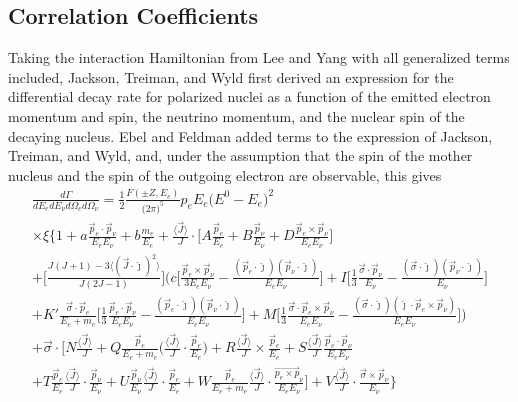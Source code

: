 \subsection{Correlation Coefficients} \label{ssec:correlations}
Taking the interaction Hamiltonian from Lee and Yang with all generalized terms included,
Jackson, Treiman, and Wyld \cite{jackson1957a,jackson1957b} first derived an expression
for the differential decay rate for polarized nuclei as a function of the emitted electron momentum
and spin, the neutrino momentum, and the nuclear spin of the decaying nucleus.
Ebel and Feldman \cite{ebel1957} added terms to the expression of Jackson, Treiman, and Wyld,
and, under the assumption that the spin of the mother nucleus and the spin of the outgoing electron
are observable, this gives
%
\begin{multline}
  \frac{d\Gamma}{dE_e dE_\nu d\Omega_e d\Omega_\nu} = \frac{1}{2} \frac{F(\pm Z, E_e)}{\big( 2\pi \big)^5}
  p_e E_e \big( E^0 - E_e \big)^2 \\ \times \xi 
  \Bigg\{ 1 + a\frac{\vec{p}_e \cdot \vec{p}_\nu}{E_e E_\nu} + b\frac{m_e}{E_e} 
  + \frac{\langle\vec{ J }\rangle}{J} \cdot \Bigg[ A\frac{\vec{p}_e}{E_e}
    + B\frac{\vec{p}_\nu}{E_\nu} + D\frac{\vec{p}_e \times \vec{p}_\nu}{E_e E_\nu}\Bigg] \\
  + \Bigg[ \frac{J(J+1)-3\langle (\vec{J} \cdot \hat{\jmath})^2 \rangle}{J(2J-1)} \Bigg]
  \Bigg( c\Bigg[ \frac{\vec{p}_e \times \vec{p}_\nu}{3E_eE_\nu} -
    \frac{(\vec{p}_e \cdot \hat{\jmath})(\vec{p}_\nu \cdot \hat{\jmath}) }{E_eE_\nu} \Bigg]
  + I \Bigg[ \frac{1}{3}\frac{\vec{\sigma} \cdot \vec{p}_\nu}{E_\nu}
    - \frac{(\vec{\sigma} \cdot \hat{\jmath})(\vec{p}_\nu \cdot \hat{\jmath})}{E_\nu} \Bigg] \\
  + K'\frac{\vec{\sigma} \cdot \vec{p}_e}{E_e+m_e} \Bigg[ \frac{1}{3}\frac{\vec{p}_e \cdot \vec{p}_\nu}{E_e E_\nu}
    - \frac{(\vec{p}_e \cdot \hat{\jmath})(\vec{p}_\nu \cdot \hat{\jmath})}{E_e E_\nu} \Bigg] 
  + M \Bigg[ \frac{1}{3}\frac{\vec{\sigma} \cdot \vec{p}_e \times \vec{p}_\nu}{E_e E_\nu}
    - \frac{(\vec{\sigma} \cdot \hat{\jmath})(\hat{\jmath} \cdot \vec{p}_e \times \vec{p}_\nu )}{E_e E_\nu} \Bigg] \Bigg) \\
  + \vec{\sigma} \cdot \Bigg[ N\frac{\langle \vec{J} \rangle}{J}
    + Q\frac{\vec{p}_e}{E_e+m_e}\Bigg(\frac{\langle \vec{J} \rangle}{J} \cdot \frac{\vec{p}_e}{E_e}\Bigg)
    + R\frac{\langle \vec{J} \rangle}{J} \times \frac{\vec{p}_e}{E_e}
    + S\frac{\langle \vec{J} \rangle}{J} \frac{\vec{p}_e\cdot \vec{p}_\nu}{E_e E_\nu} \\
    + T\frac{\vec{p}_e}{E_e}\frac{\langle \vec{J} \rangle}{J} \cdot \frac{\vec{p}_\nu}{E_\nu}
    + U\frac{\vec{p}_\nu}{E_\nu}\frac{\langle \vec{J} \rangle}{J} \cdot \frac{\vec{p}_e}{E_e}
    + W\frac{\vec{p}_e}{E_e+m_e}\frac{\langle \vec{J} \rangle}{J} \cdot \frac{\vec{p_e \times p}_\nu}{E_e E_\nu}
    \Bigg]
  + V\frac{\langle \vec{J} \rangle}{J} \cdot \frac{\vec{\sigma} \times \vec{p}_\nu}{E_\nu}
  \Bigg\}
  \label{eq:jackson}
\end{multline}
